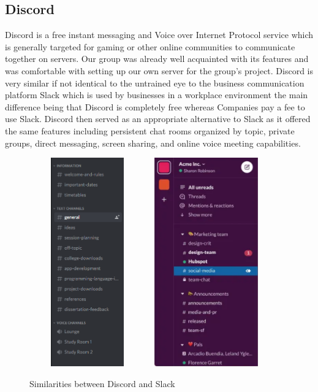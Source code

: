 \subsection{Discord}
Discord is a free instant messaging and Voice over Internet Protocol service which is generally targeted for gaming or other online communities to communicate together on servers. Our group was already well acquainted with its features and was comfortable with setting up our own server for the group's project. Discord is very similar if not identical to the untrained eye to the business communication platform Slack which is used by businesses in a workplace environment the main difference being that Discord is completely free whereas Companies pay a fee to use Slack.  \newline \newline 
Discord then served as an appropriate alternative to Slack as it offered the same features including persistent chat rooms organized by topic, private groups, direct messaging, screen sharing, and online voice meeting \newline capabilities.
\begin{figure}[H]
    \centering
    \includegraphics[width=5cm, height = 9cm]{img/discord_channels.png}
    \includegraphics[width=5cm, height = 9cm]{img/slack_channels.png}
    \caption{Similarities between Discord and Slack}
    \label{fig:Similarities between Discord and Slack}
\end{figure}


